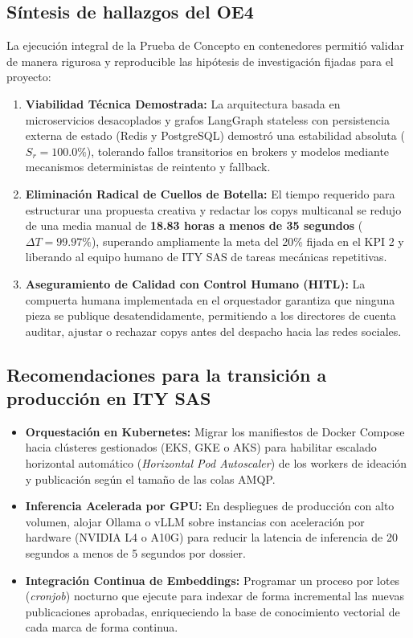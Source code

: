 \documentclass[11pt,a4paper]{article}
\newcommand{\code}[1]{\texttt{\detokenize{#1}}}
\begin{document}
\subsection{Síntesis de hallazgos del OE4}
La ejecución integral de la Prueba de Concepto en contenedores permitió validar de manera rigurosa y reproducible las hipótesis de investigación fijadas para el proyecto:
\begin{enumerate}[leftmargin=*]
    \item \textbf{Viabilidad Técnica Demostrada:} La arquitectura basada en microservicios desacoplados y grafos LangGraph stateless con persistencia externa de estado (Redis y PostgreSQL) demostró una estabilidad absoluta ($S_r = 100.0\%$), tolerando fallos transitorios en brokers y modelos mediante mecanismos deterministas de reintento y fallback.
    \item \textbf{Eliminación Radical de Cuellos de Botella:} El tiempo requerido para estructurar una propuesta creativa y redactar los copys multicanal se redujo de una media manual de \textbf{18.83 horas a menos de 35 segundos} ($\Delta T = 99.97\%$), superando ampliamente la meta del 20\% fijada en el KPI 2 y liberando al equipo humano de ITY SAS de tareas mecánicas repetitivas.
    \item \textbf{Aseguramiento de Calidad con Control Humano (HITL):} La compuerta humana implementada en el orquestador garantiza que ninguna pieza se publique desatendidamente, permitiendo a los directores de cuenta auditar, ajustar o rechazar copys antes del despacho hacia las redes sociales.
\end{enumerate}

\subsection{Recomendaciones para la transición a producción en ITY SAS}
\begin{itemize}[leftmargin=*]
    \item \textbf{Orquestación en Kubernetes:} Migrar los manifiestos de Docker Compose hacia clústeres gestionados (EKS, GKE o AKS) para habilitar escalado horizontal automático (\textit{Horizontal Pod Autoscaler}) de los workers de ideación y publicación según el tamaño de las colas AMQP.
    \item \textbf{Inferencia Acelerada por GPU:} En despliegues de producción con alto volumen, alojar Ollama o vLLM sobre instancias con aceleración por hardware (NVIDIA L4 o A10G) para reducir la latencia de inferencia de 20 segundos a menos de 5 segundos por dossier.
    \item \textbf{Integración Continua de Embeddings:} Programar un proceso por lotes (\textit{cronjob}) nocturno que ejecute \code{backfill_embeddings.py} para indexar de forma incremental las nuevas publicaciones aprobadas, enriqueciendo la base de conocimiento vectorial de cada marca de forma continua.
\end{itemize}
\end{document}
